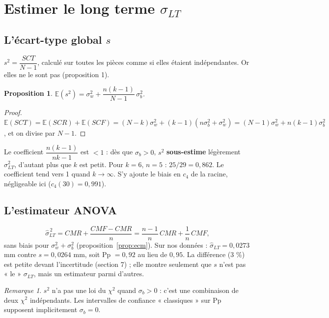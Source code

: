 \documentclass[11pt,a4paper]{article}
\theoremstyle{tq}
\newtheorem{prop}{Proposition}
\theoremstyle{remark}
\newtheorem*{rem}{Remarque}
\newcommand{\E}{\mathbb{E}}
\newcommand{\sw}{\sigma_w}
\newcommand{\sbt}{\sigma_b}
\begin{document}
\section{Estimer le long terme $\sigma_{LT}$}

\subsection{L'écart-type global $s$}

$s^2 = \dfrac{SCT}{N-1}$, calculé sur toutes les pièces comme si elles étaient indépendantes. Or elles ne le sont pas (proposition 1).

\begin{prop}
$\E(s^2) = \sw^2 + \dfrac{n(k-1)}{N-1}\,\sbt^2$.
\end{prop}
\begin{proof}
$\E(SCT)=\E(SCR)+\E(SCF)=(N-k)\sw^2+(k-1)(n\sbt^2+\sw^2) = (N-1)\sw^2+n(k-1)\sbt^2$, et on divise par $N-1$.
\end{proof}

Le coefficient $\dfrac{n(k-1)}{nk-1}$ est $<1$ : dès que $\sbt>0$, $s^2$ \textbf{sous-estime} légèrement $\sigma_{LT}^2$, d'autant plus que $k$ est petit. Pour $k=6$, $n=5$ : $25/29 = 0{,}862$. Le coefficient tend vers 1 quand $k\to\infty$. S'y ajoute le biais en $c_4$ de la racine, négligeable ici ($c_4(30)=0{,}991$).

\subsection{L'estimateur ANOVA}

\[
\hat\sigma_{LT}^{\,2} = CMR + \frac{CMF-CMR}{n} = \frac{n-1}{n}\,CMR + \frac1n\,CMF,
\]
sans biais pour $\sw^2+\sbt^2$ (proposition~\ref{prop:ecm}). Sur nos données : $\hat\sigma_{LT} = 0{,}0273$ mm contre $s = 0{,}0264$ mm, soit Pp $=0{,}92$ au lieu de $0{,}95$. La différence (3 \%) est petite devant l'incertitude (section 7) ; elle montre seulement que $s$ n'est pas « le » $\sigma_{LT}$, mais un estimateur parmi d'autres.

\begin{rem}
$s^2$ n'a pas une loi du $\chi^2$ quand $\sbt>0$ : c'est une combinaison de deux $\chi^2$ indépendants. Les intervalles de confiance « classiques » sur Pp supposent implicitement $\sbt = 0$.
\end{rem}

\end{document}
